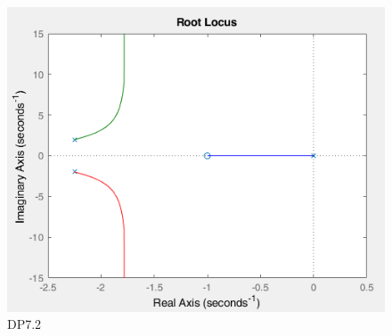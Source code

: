 \documentclass{article}
\begin{document}
\begin{center}
		\begin{figure}
			\centering
			\includegraphics[scale=0.6]{dp2}
			\caption{DP7.2}
		\end{figure}
	\end{center}
\end{document}
